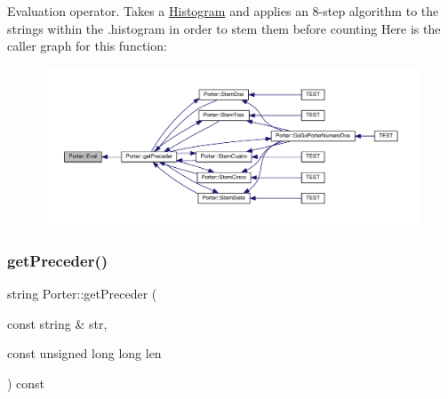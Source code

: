 Evaluation operator. Takes a \hyperlink{class_histogram}{Histogram} and applies an 8-\/step algorithm to the strings within the .histogram in order to stem them before counting Here is the caller graph for this function\+:
\nopagebreak
\begin{figure}[H]
\begin{center}
\leavevmode
\includegraphics[width=350pt]{class_porter_afbe6ae10a924a4419e62a20babe3be7d_icgraph}
\end{center}
\end{figure}
\mbox{\label{class_porter_a2000ce7eeabb3a7d9593fa9790a4fdc4}} 
\subsubsection{\texorpdfstring{get\+Preceder()}{getPreceder()}}
{\footnotesize\ttfamily string Porter\+::get\+Preceder (\begin{DoxyParamCaption}\item[{const string \&}]{str,  }\item[{const unsigned long long}]{len }\end{DoxyParamCaption}) const\hspace{0.3cm}{\ttfamily [inline]}}

